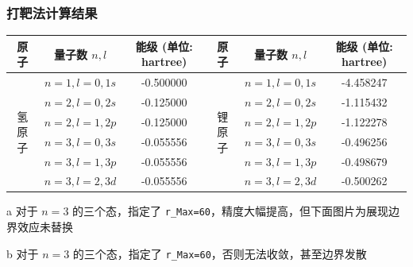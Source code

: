 \subsubsection{打靶法计算结果}
\begin{threeparttable}
    \begin{tabular}{|c|c|c|c|c|c|}
        \hline
        原子                   & 量子数 \(n, l\)     & 能级 (单位: hartree)   & 原子                   & 量子数 \(n, l\)     & 能级 (单位: hartree)   \\ \hline
        \multirow{6}{*}{氢原子} & \(n=1, l=0, 1s\) & -0.500000          & \multirow{6}{*}{锂原子} & \(n=1, l=0, 1s\) & -4.458247          \\ \cline{2-3} \cline{5-6}
                             & \(n=2, l=0, 2s\) & -0.125000          &                      & \(n=2, l=0, 2s\) & -1.115432          \\ \cline{2-3} \cline{5-6}
                             & \(n=2, l=1, 2p\) & -0.125000          &                      & \(n=2, l=1, 2p\) & -1.122278          \\ \cline{2-3} \cline{5-6}
                             & \(n=3, l=0, 3s\) & -0.055556          &                      & \(n=3, l=0, 3s\) & -0.496256\tnote{b} \\ \cline{2-3} \cline{5-6}
                             & \(n=3, l=1, 3p\) & -0.055556\tnote{a} &                      & \(n=3, l=1, 3p\) & -0.498679          \\ \cline{2-3} \cline{5-6}
                             & \(n=3, l=2, 3d\) & -0.055556          &                      & \(n=3, l=2, 3d\) & -0.500262          \\ \hline
    \end{tabular}
    \begin{tablenotes}
        \item[a] 对于 \(n=3\) 的三个态，指定了 \texttt{r\_Max=60}，精度大幅提高，但下面图片为展现边界效应未替换
        
        \item[b] 对于 \(n=3\) 的三个态，指定了 \texttt{r\_Max=60}，否则无法收敛，甚至边界发散
    \end{tablenotes}
\end{threeparttable}
